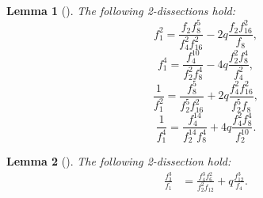 \documentclass[11pt, reqno]{amsart}
\newtheorem{lma}{Lemma}[section]
\numberwithin{equation}{section}
\begin{document}
	\begin{lma} [{\cite[Entry~25]{berndt2012ramanujan}}] The following 2-dissections hold: 
		\begin{equation}\label{f12}
			f_1^2 =\frac{f_2 f_8^5}{f_4^2 f_{16}^2}
			-2q\frac{f_2 f_{16}^2}{f_8},
		\end{equation}
		\begin{equation}\label{f14}
			f_1^4 =\frac{f_4^{10}}{f_2^2 f_{8}^4}
			-4q\frac{f_2^2 f_{8}^4}{f_4^2},
		\end{equation}
		\begin{equation}\label{1byf12}
			\frac{1}{f_1^2} =\frac{f_8^5}{f_2^5 f_{16}^2}
			+2q\frac{f_4^2 f_{16}^2}{f_2^5 f_8},
		\end{equation}
		\begin{equation}\label{1byf14}
			\frac{1}{f_1^4} =\frac{f_4^{14}}{f_2^{14} f_{8}^4}
			+4q\frac{f_4^2 f_{8}^4}{f_2^{10}}.
		\end{equation}
	\end{lma}
	\begin{lma}[{\cite{hirschhorn1993cubic}}]The following 2-dissection hold:
		\begin{align}
			\frac{f_3^3}{f_1} &= \frac{f_4^3f_6^2}{f_2^2f_{12}}+q\frac{f_{12}^3}{f_4}.\label{f33byf1}
		\end{align}
	\end{lma}
	
\end{document}
